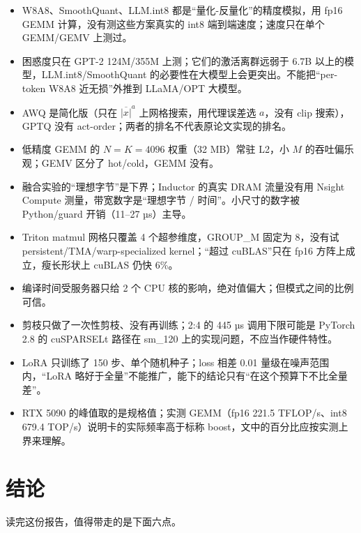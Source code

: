 \documentclass[11pt,a4paper]{ctexart}
\begin{document}
\begin{caveatbox}
\begin{itemize}
\item W8A8、SmoothQuant、LLM.int8 都是“量化-反量化”的精度模拟，用 fp16 GEMM 计算，没有测这些方案真实的 int8 端到端速度；速度只在单个 GEMM/GEMV 上测过。
\item 困惑度只在 GPT-2 124M/355M 上测；它们的激活离群远弱于 6.7B 以上的模型，LLM.int8/SmoothQuant 的必要性在大模型上会更突出。不能把“per-token W8A8 近无损”外推到 LLaMA/OPT 大模型。
\item AWQ 是简化版（只在 $\overline{|x|}^a$ 上网格搜索，用代理误差选 $a$，没有 clip 搜索），GPTQ 没有 act-order；两者的排名不代表原论文实现的排名。
\item 低精度 GEMM 的 $N{=}K{=}4096$ 权重（32 MB）常驻 L2，小 $M$ 的吞吐偏乐观；GEMV 区分了 hot/cold，GEMM 没有。
\item 融合实验的“理想字节”是下界；Inductor 的真实 DRAM 流量没有用 Nsight Compute 测量，带宽数字是“理想字节 / 时间”。小尺寸的数字被 Python/guard 开销（11--27 µs）主导。
\item Triton matmul 网格只覆盖 4 个超参维度，GROUP\_M 固定为 8，没有试 persistent/TMA/warp-specialized kernel；“超过 cuBLAS”只在 fp16 方阵上成立，瘦长形状上 cuBLAS 仍快 6\%。
\item 编译时间受服务器只给 2 个 CPU 核的影响，绝对值偏大；但模式之间的比例可信。
\item 剪枝只做了一次性剪枝、没有再训练；2:4 的 445 µs 调用下限可能是 PyTorch 2.8 的 cuSPARSELt 路径在 sm\_120 上的实现问题，不应当作硬件特性。
\item LoRA 只训练了 150 步、单个随机种子；loss 相差 0.01 量级在噪声范围内，“LoRA 略好于全量”不能推广，能下的结论只有“在这个预算下不比全量差”。
\item RTX 5090 的峰值取的是规格值；实测 GEMM（fp16 221.5 TFLOP/s、int8 679.4 TOP/s）说明卡的实际频率高于标称 boost，文中的百分比应按实测上界来理解。
\end{itemize}
\end{caveatbox}

\section{结论}

读完这份报告，值得带走的是下面六点。
\end{document}
